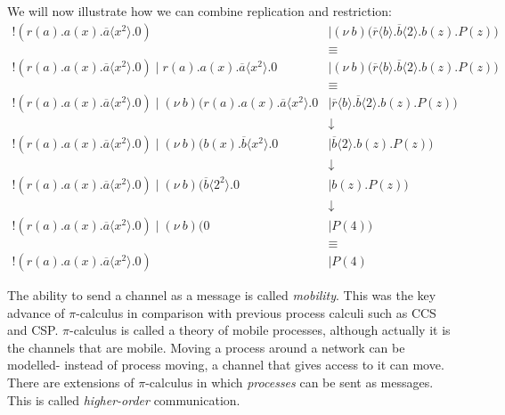 \documentclass[a4paper, openany]{memoir}
\theoremstyle{definition}
\begin{document}
    We will now illustrate how we can combine replication and restriction:
    \begin{align*}
        !(r(a).a(x).\overline{a} \langle x^2 \rangle.0) &\mid (\nu \ b) \textbf{(} \overline{r} \langle b \rangle.\overline{b} \langle 2 \rangle.b(z).P(z) \textbf{)} \\
        &\equiv \\
        !(r(a).a(x).\overline{a} \langle x^2 \rangle.0) \mid r(a).a(x).\overline{a} \langle x^2 \rangle.0 & \mid (\nu \ b) \textbf{(} \overline{r} \langle b \rangle.\overline{b} \langle 2 \rangle.b(z).P(z) \textbf{)} \\
        &\equiv \\
        !(r(a).a(x).\overline{a} \langle x^2 \rangle.0) \mid (\nu \ b) \textbf{(} r(a).a(x).\overline{a} \langle x^2 \rangle.0 & \mid \overline{r} \langle b \rangle.\overline{b} \langle 2 \rangle.b(z).P(z) \textbf{)} \\
        &\downarrow \\
        !(r(a).a(x).\overline{a} \langle x^2 \rangle.0) \mid (\nu \ b) \textbf{(} b(x).\overline{b} \langle x^2 \rangle.0 & \mid \overline{b} \langle 2 \rangle.b(z).P(z) \textbf{)} \\
        &\downarrow \\
        !(r(a).a(x).\overline{a} \langle x^2 \rangle.0) \mid (\nu \ b) \textbf{(} \overline{b} \langle 2^2 \rangle.0 & \mid b(z).P(z) \textbf{)} \\
        &\downarrow \\
        !(r(a).a(x).\overline{a} \langle x^2 \rangle.0) \mid (\nu \ b) \textbf{(} 0 & \mid P(4) \textbf{)} \\
        &\equiv \\
        !(r(a).a(x).\overline{a} \langle x^2 \rangle.0) &\mid P(4) 
    \end{align*}

    The ability to send a channel as a message is called \emph{mobility}. This was the key advance of $\pi$-calculus in comparison with previous process calculi such as CCS and CSP. $\pi$-calculus is called a theory of mobile processes, although actually it is the channels that are mobile. Moving a process around a network can be modelled- instead of process moving, a channel that gives access to it can move. There are extensions of $\pi$-calculus in which \emph{processes} can be sent as messages. This is called \emph{higher-order} communication.
\end{document}
